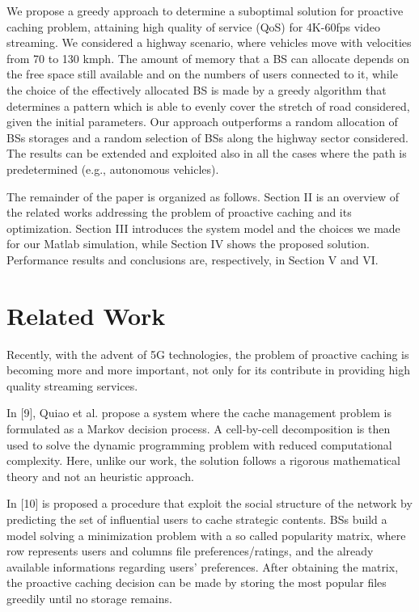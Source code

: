 \documentclass[conference,10pt]{IEEEtran}
\begin{document}
We propose a greedy approach to determine a suboptimal solution for proactive caching problem, attaining  high quality of service (QoS) for 4K-60fps video streaming. We considered a highway scenario, where vehicles move with velocities from 70 to 130 kmph. The amount of memory that a BS can allocate depends on the free space still available and on the numbers of users connected to it, while the choice of the effectively allocated BS is made by a greedy algorithm that determines a pattern which is able to evenly cover the stretch of road considered, given the initial parameters. Our approach outperforms a random allocation of BSs storages and a random selection of BSs along the highway sector considered. The results can be extended and exploited also in all the cases where the path is predetermined (e.g., autonomous vehicles).

The remainder of the paper is organized as follows. Section II is an overview of the related works addressing the problem of proactive caching and its optimization. Section III introduces the system model and the choices we made for our Matlab simulation, while Section IV shows the proposed solution. Performance results and conclusions are, respectively, in Section V and VI.
\section{Related Work}\label{sec:sota}
Recently, with the advent of 5G technologies, the problem of proactive caching is becoming more and more important, not only for its contribute in providing high quality streaming services.

In [9], Quiao et al. propose a system where the cache management problem is formulated as a Markov decision process. A cell-by-cell decomposition is then used to solve the dynamic programming problem with reduced computational complexity. Here, unlike our work, the solution follows a rigorous mathematical theory and not an heuristic approach.

In [10] is proposed a procedure that exploit the social structure of the network by predicting the set of influential users to cache strategic contents. BSs build a model solving a minimization problem with  a so called popularity matrix, where row represents users and columns file preferences/ratings, and the already available informations regarding users' preferences. After obtaining the matrix, the proactive caching decision can be made by storing the most popular files greedily until no storage remains.
\end{document}
